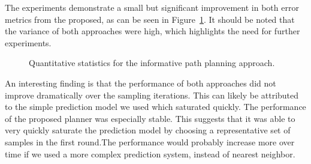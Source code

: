 The experiments demonstrate a small but significant improvement in both error metrics from the proposed, as can be seen in Figure~\ref{fig:results:ipp_quant}. It should be noted that the variance of both approaches were high, which highlights the need for further experiments.

\begin{figure}[h]
    \hfill
    \hfill
    \centering
    \caption{Quantitative statistics for the informative path planning approach.}
    \label{fig:results:ipp_quant}
\end{figure}



An interesting finding is that the performance of both approaches did not improve dramatically over the sampling iterations. This can likely be attributed to the simple prediction model we used which saturated quickly. The performance of the proposed planner was especially stable. This suggests that it was able to very quickly saturate the prediction model by choosing a representative set of samples in the first round.The performance would probably increase more over time if we used a more complex prediction system, instead of nearest neighbor. 

